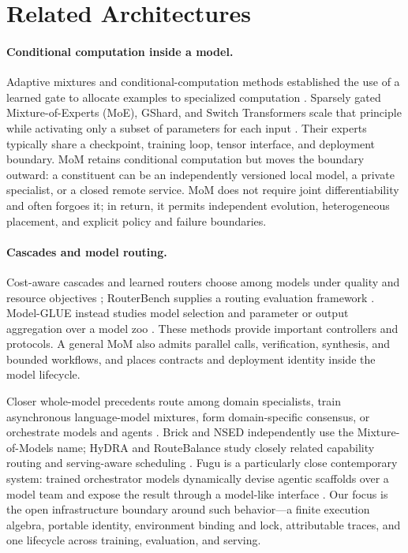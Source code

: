 \section{Related Architectures}
\label{sec:related}

\paragraph{Conditional computation inside a model.}
Adaptive mixtures and conditional-computation methods established the use of a
learned gate to allocate examples to specialized computation
\citep{jacobs_1991_mixture,bengio_2013_conditional}. Sparsely gated
Mixture-of-Experts (MoE), GShard, and Switch Transformers scale that principle
while activating only a subset of parameters for each input
\citep{shazeer_2017_moe,lepikhin_2020_gshard,fedus_2021_switch}. Their experts
typically share a checkpoint, training loop, tensor interface, and deployment
boundary. MoM retains conditional computation but moves the boundary outward:
a constituent can be an independently versioned local model, a private
specialist, or a closed remote service. MoM does not require joint
differentiability and often forgoes it; in return, it permits independent
evolution, heterogeneous placement, and explicit policy and failure boundaries.

\paragraph{Cascades and model routing.}
Cost-aware cascades and learned routers choose among models under quality and
resource objectives
\citep{aggarwal_2023_automix,chen_2023_frugalgpt,ding_2024_hybrid,
ong_2024_routellm}; RouterBench supplies a routing evaluation framework
\citep{hu_2024_routerbench}. Model-GLUE instead studies model selection and
parameter or output aggregation over a model zoo \citep{zhao_2024_modelglue}.
These methods provide important controllers and protocols. A general MoM also
admits parallel calls, verification, synthesis, and bounded workflows, and
places contracts and deployment identity inside the model lifecycle.

Closer whole-model precedents route among domain specialists, train asynchronous
language-model mixtures, form domain-specific consensus, or orchestrate models
and agents \citep{simonds_2024_modem,filippova_2025_smalltalk,
wang_2025_telemom,guo_2025_moma,pecerskis_2026_nsed}. Brick and NSED
independently use the Mixture-of-Models name; HyDRA and RouteBalance study
closely related capability routing and serving-aware scheduling
\citep{massa_2026_brick,garg_2026_hydra,da_2026_routebalance}. Fugu is a
particularly close contemporary system: trained orchestrator models dynamically devise
agentic scaffolds over a model team and expose the result through a model-like
interface \citep{tang_2026_fugu}. Our focus is the open infrastructure boundary
around such behavior---a finite execution algebra, portable identity,
environment binding and lock, attributable traces, and one lifecycle across
training, evaluation, and serving.

